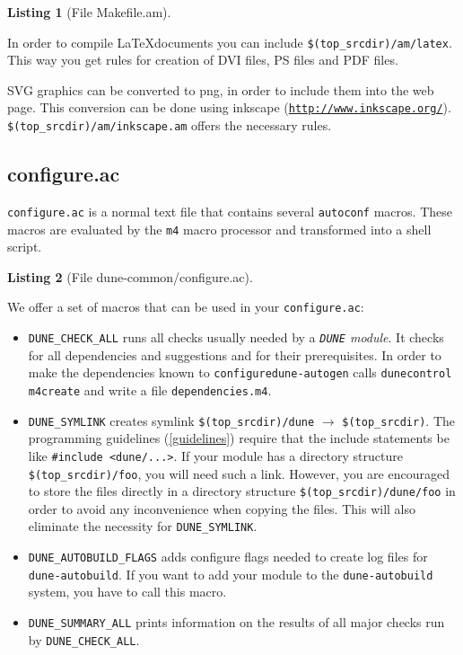\documentclass[11pt,a4paper,headinclude,footinclude,DIV16,normalheadings]{scrartcl}
\newtheorem{lst}{Listing}
\newcommand{\dune}{\texttt{DUNE}\xspace}
\newcommand{\autoconf}{\texttt{autoconf}\xspace}
\newcommand{\autogen}{\texttt{dune-autogen}\xspace}
\newcommand{\configure}{\texttt{configure}\xspace}
\newcommand{\configureac}{\texttt{configure.ac}\xspace}
\newcommand{\topsrc}{\$(top\_srcdir)}
\begin{document}
\hspace*{-2ex}\begin{minipage}{\textwidth}
\begin{lst}[File Makefile.am] \mbox{}

\end{lst}
\end{minipage}

In order to compile \LaTeX documents you can include
\texttt{\$(top\_srcdir)/am/latex}. This way you get rules for creation
of DVI files, PS files and PDF files.

SVG graphics can be converted to png, in order to include them into
the web page. This conversion can be done using inkscape
(\texttt{\url{http://www.inkscape.org/}}).
\texttt{\$(top\_srcdir)/am/inkscape.am} offers the necessary rules.


\subsection{configure.ac}
\label{configure.ac}

\configureac  is a normal text file that contains several \autoconf
macros. These macros are evaluated by the \texttt{m4} macro processor
and transformed into a shell script.

\begin{lst}[File dune-common/configure.ac] \mbox{}

\end{lst}

We offer a set of macros that can be used in your \configureac:

\begin{itemize}
\item \texttt{DUNE\_CHECK\_ALL}
  runs all checks usually needed by a {\em \dune module}.
  It checks for all dependencies and suggestions and for their
  prerequisites.
  In order to make the dependencies known to \configure \autogen calls
  \texttt{dunecontrol m4create} and write a file
  \texttt{dependencies.m4}.
\item \texttt{DUNE\_SYMLINK}
  creates symlink \texttt{\$(top\_srcdir)/dune} $\rightarrow$
  \texttt{\$(top\_srcdir)}. The programming guidelines (\ref{guidelines})
  require that the include statements be like \texttt{\#include
    <dune/...>}. If your module has a directory structure
  \texttt{\topsrc/foo}, you will need such a link. However, you are
  encouraged to store the files directly in a directory structure
  \texttt{\topsrc/dune/foo} in order to avoid any inconvenience when
  copying the files. This will also eliminate the necessity for
  \texttt{DUNE\_SYMLINK}.
\item \texttt{DUNE\_AUTOBUILD\_FLAGS}
  adds configure flags needed to create log files for
  \texttt{dune-autobuild}. If you want to add your module to the
  \texttt{dune-autobuild} system, you have to call this macro.
\item \texttt{DUNE\_SUMMARY\_ALL}
  prints information on the results of all major checks run by
  \texttt{DUNE\_CHECK\_ALL}.
\end{itemize}
\end{document}
